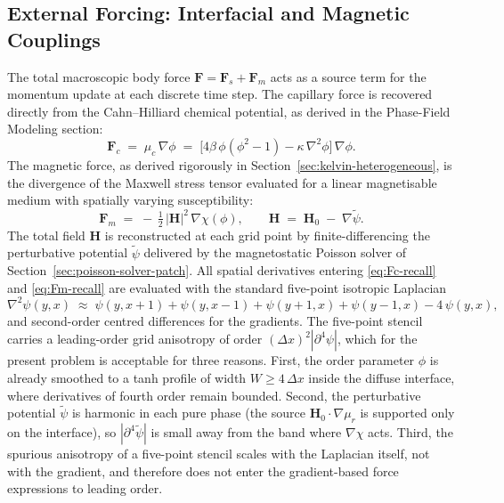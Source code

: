 \subsection{External Forcing: Interfacial and Magnetic Couplings}
The total macroscopic body force $\mathbf{F} = \mathbf{F}_s + \mathbf{F}_m$ acts as a source term for the momentum update at each discrete time step.
The capillary force is recovered directly from the Cahn--Hilliard chemical potential, as derived in the Phase-Field Modeling section:
\begin{equation}
\bm{F}_c \;=\; \mu_c\,\nabla\phi
    \;=\; \bigl[4\beta\,\phi(\phi^{2} - 1) - \kappa\,\nabla^{2}\phi\bigr]\,\nabla\phi.
\label{eq:Fc-recall}
\end{equation}
The magnetic force, as derived rigorously in Section~\ref{sec:kelvin-heterogeneous}, is the divergence of the Maxwell stress tensor evaluated for a linear magnetisable medium with spatially varying susceptibility:
\begin{equation}
\bm{F}_m \;=\; -\,\tfrac{1}{2}\,|\bm{H}|^{2}\,\nabla\chi(\phi),
\qquad
\bm{H} \;=\; \bm{H}_0 \;-\; \nabla\tilde{\psi}.
\label{eq:Fm-recall}
\end{equation}
The total field $\bm{H}$ is reconstructed at each grid point by finite-differencing the perturbative potential $\tilde{\psi}$ delivered by the magnetostatic Poisson solver of Section~\ref{sec:poisson-solver-patch}.
All spatial derivatives entering \eqref{eq:Fc-recall} and \eqref{eq:Fm-recall} are evaluated with the standard five-point isotropic Laplacian
\begin{equation}
\nabla^{2}\psi(y, x) \;\approx\; \psi(y, x{+}1) + \psi(y, x{-}1) + \psi(y{+}1, x) + \psi(y{-}1, x) - 4\,\psi(y, x),
\end{equation}
and second-order centred differences for the gradients.
The five-point stencil carries a leading-order grid anisotropy of order $(\Delta x)^{2}|\partial^{4}\psi|$, which for the present problem is acceptable for three reasons.
First, the order parameter $\phi$ is already smoothed to a tanh profile of width $W \geq 4\,\Delta x$ inside the diffuse interface, where derivatives of fourth order remain bounded.
Second, the perturbative potential $\tilde{\psi}$ is harmonic in each pure phase (the source $\bm{H}_0\!\cdot\!\nabla\mu_r$ is supported only on the interface), so $|\partial^{4}\tilde{\psi}|$ is small away from the band where $\nabla\chi$ acts.
Third, the spurious anisotropy of a five-point stencil scales with the Laplacian itself, not with the gradient, and therefore does not enter the gradient-based force expressions to leading order.
